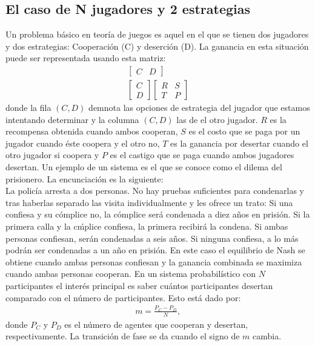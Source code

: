 \documentclass[letterpaper,12pt,oneside]{book}
\begin{document}
\subsection{El caso de N jugadores y 2 estrategias}
Un problema b\'asico en teor\'ia de juegos es aquel en el que se tienen dos jugadores y dos estrategias: Cooperaci\'on (C) y deserci\'on (D). La ganancia en esta situaci\'on puede ser representada usando esta matriz:
%
\begin{eqnarray}
\begin{bmatrix}
  C & D
\end{bmatrix} \\ \nonumber
\begin{bmatrix}
  C\\
  D
\end{bmatrix}\nonumber
\begin{bmatrix}
  R & S\\
  T & P
\end{bmatrix}\label{matrizNash}
\end{eqnarray}
%
donde la fila $(C,D)$ demnota las opciones de estrategia del jugador que estamos intentando determinar y la columna $(C, D)$ las de el otro jugador. $R$ es la recompensa obtenida cuando ambos cooperan, $S$ es el costo que se paga por un jugador cuando \'este coopera y el otro no, $T$ es la ganancia por desertar cuando el otro jugador si coopera y $P$ es el castigo que se paga cuando ambos jugadores desertan.
Un ejemplo de un sistema es el que se conoce como el dilema del prisionero. La encunciación es la siguiente: \\
La polic\'ia arresta a dos personas. No hay pruebas suficientes para condenarlas y tras haberlas separado las visita individualmente y les ofrece un trato: Si una confiesa y su c\'omplice no, la c\'omplice será condenada a diez a\~nos en prisi\'on. Si la primera calla y la c\'mplice confiesa, la primera recibir\'a la condena. Si ambas personas confiesan, ser\'an condenadas a seis años. Si ninguna confiesa, a lo m\'as podr\'an ser condenadas a un año en prisi\'on.
En este caso el equilibrio de Nash se obtiene cuando ambas personas confiesan y la ganancia combinada se maximiza cuando ambas personas cooperan.
En un sistema probabil\'istico con $N$ participantes el inter\'es principal es saber cu\'antos participantes desertan comparado con el n\'umero de participantes. Esto est\'a dado por: 
%
\begin{eqnarray}
m=\frac{P_C - P_D}{N}, \label{mJuegos}
\end{eqnarray}
%
donde $P_C$ y $P_D$ es el n\'umero de agentes que cooperan y desertan, respectivamente. La transici\'on de fase se da cuando el signo de $m$ cambia.
\end{document}

